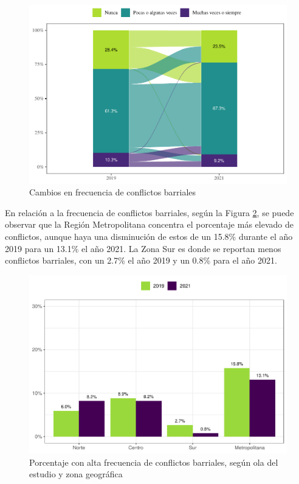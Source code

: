 \documentclass[
  12pt,
]{book}
\begin{document}
\begin{figure}

{\centering \includegraphics{reporte-elsoc_files/figure-latex/confli-cambio-1} 

}

\caption{Cambios en frecuencia de conflictos barriales}\label{fig:confli-cambio}
\end{figure}

En relación a la frecuencia de conflictos barriales, según la Figura \ref{fig:confli-zona}, se puede observar que la Región Metropolitana concentra el porcentaje más elevado de conflictos, aunque haya una disminución de estos de un 15.8\% durante el año 2019 para un 13.1\% el año 2021. La Zona Sur es donde se reportan menos conflictos barriales, con un 2.7\% el año 2019 y un 0.8\% para el año 2021.

\begin{figure}

{\centering \includegraphics{reporte-elsoc_files/figure-latex/confli-zona-1} 

}

\caption{Porcentaje con alta frecuencia de conflictos barriales, según ola del estudio y zona geográfica}\label{fig:confli-zona}
\end{figure}
\end{document}
